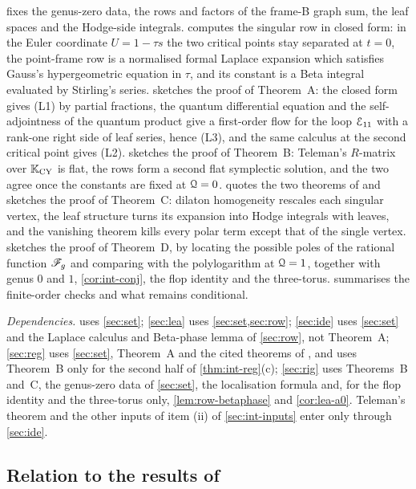  fixes the genus-zero data, the rows and factors of the frame-B graph sum, the leaf spaces and the Hodge-side integrals.  computes the singular row in closed form: in the Euler coordinate $U=1-\tau s$ the two critical points stay separated at $t=0$, the point-frame row is a normalised formal Laplace expansion which satisfies Gauss's hypergeometric equation in $\tau$, and its constant is a Beta integral evaluated by Stirling's series.  sketches the proof of Theorem~A: the closed form gives (L1) by partial fractions, the quantum differential equation and the self-adjointness of the quantum product give a first-order flow for the loop $\mathcal{E}_{11}$ with a rank-one right side of leaf series, hence (L3), and the same calculus at the second critical point gives (L2).  sketches the proof of Theorem~B: Teleman's $R$-matrix over $\mathbb{K}_{\mathrm{CY}}$ is flat, the rows form a second flat symplectic solution, and the two agree once the constants are fixed at $\mathcal{Q}=0$.  quotes the two theorems of \cite{LP2} and sketches the proof of Theorem~C: dilaton homogeneity rescales each singular vertex, the leaf structure turns its expansion into Hodge integrals with leaves, and the vanishing theorem kills every polar term except that of the single vertex.  sketches the proof of Theorem~D, by locating the possible poles of the rational function $\mathscr{F}_g$ and comparing with the polylogarithm at $\mathcal{Q}=1$, together with genus $0$ and $1$, \cref{cor:int-conj}, the flop identity and the three-torus.  summarises the finite-order checks and what remains conditional.

\emph{Dependencies.}  uses \cref{sec:set}; \cref{sec:lea} uses \cref{sec:set,sec:row}; \cref{sec:ide} uses \cref{sec:set} and the Laplace calculus and Beta-phase lemma of \cref{sec:row}, not Theorem~A; \cref{sec:reg} uses \cref{sec:set}, Theorem~A and the cited theorems of \cite{LP2}, and uses Theorem~B only for the second half of \cref{thm:int-reg}(c); \cref{sec:rig} uses Theorems~B and~C, the genus-zero data of \cref{sec:set}, the localisation formula \cite{GP99} and, for the flop identity and the three-torus only, \cref{lem:row-betaphase} and \cref{cor:lea-a0}. Teleman's theorem and the other inputs of item (ii) of \cref{sec:int-inputs} enter only through \cref{sec:ide}.

\subsection{Relation to the results of \texorpdfstring{\cite{BS}}{[BS]}}
\label{sec:int-BS}

